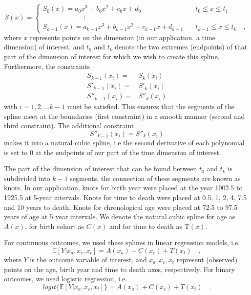 \documentclass[12pt,oneside,a4paper]{article} %
\begin{document}
\begin{appendices}
\begin{equation}
S(x) = \begin{cases}
    S_0(x) = a_0x^3+b_0x^2+c_0x+d_0 &\quad t_0 \le x \le t_1 \\
    \quad\quad\quad\quad\quad\quad \vdots \\
    S_{k-1}(x) = a_{k-1}x^3 +b_{k-1}x^2+c_{k-1}x+d_{k-1} &\quad t_{k-1} \le x \le t_k        \quad ,   
\end{cases}
\end{equation}
where $x$ represents points on the dimension (in our application, a time dimension) of interest, and $t_0$ and $t_k$  denote the two extremes (endpoints) of that part of the dimension of interest for which we wish to create this spline. Furthermore, the constraints
\begin{align}
S_{k-1}(x_i) =& S_k(x_i)\\
S'_{k-1}(x_i) =& S'_k(x_i)\\
S''_{k-1}(x_i) =& S''_k(x_i)
\end{align}
with $i=1,2,\ldots k-1$ must be satisfied. This ensures that the segments of the spline meet at the boundaries (first constraint) in a smooth manner (second and third constraint). The additional constraint
\begin{equation}
S''_{k-1}(x_i) = S''_k(x_i)
\end{equation}
makes it into a natural cubic spline, i.e the second derivative of each polynomial is set to 0 at the endpoints of our part of the time dimension of interest.

The part of the dimension of interest that can be found between $t_0$ and $t_k$ is subdivided into $k-1$ segments, the connection of these segments are known as knots. In our application, knots for birth year were placed at the year 1902.5 to 1925.5 at 5-year intervals. Knots for time to death were placed at 0.5, 1, 2, 4, 7.5 and 10 years to death. Knots for chronological age were placed at 72.5 to 97.5 years of age at 5 year intervals. We denote the natural cubic spline for age as $A(x)$, for birth cohort as $C(x)$ and for time to death as T$(x)$.

For continuous outcomes, we used these splines in linear regression models, i.e.
\begin{equation}
\mathbb{E}[Y| x_a,x_c,x_t]=A(x_a)+C(x_c)+T(x_t) \quad,
\end{equation}
where $Y$ is the outcome variable of interest, and $x_a,x_c,x_t$ represent (observed) points on the age, birth year and time to death axes, respectively. For binary outcomes, we used logistic regression, i.e.
\begin{equation}
logit\{\mathbb{E}[Y| x_a,x_c,x_t]\}=A(x_a)+C(x_c)+T(x_t) \quad .
\end{equation}


\end{appendices}
\end{document}

